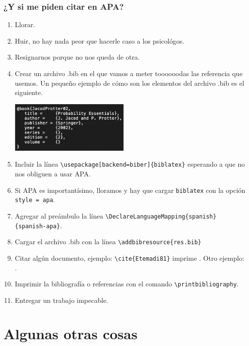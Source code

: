 \documentclass{beamer}
\begin{document}
\begin{frame}[allowframebreaks]
    \frametitle{¿Y si me piden citar en APA?}

    \begin{enumerate}
        \item Llorar.
        \item Huir, no hay nada peor que hacerle caso a los psicológos. 
        \item Resignarnos porque no nos queda de otra.
        \item Crear un archivo .bib en el que vamos a meter toooooodas las referencia que usemos. Un pequeño ejemplo de cómo son los elementos del archivo .bib es el siguiente.
        \begin{center}
            \includegraphics[height=1in]{images/ejemplo.png}
        \end{center}
        \item Incluir la línea \texttt{\textbackslash{}usepackage[backend=biber]\{biblatex\}} esperando a que no nos obliguen a usar APA.
        \item Si APA es importantísimo, lloramos y hay que cargar \texttt{biblatex} con la opción \texttt{style = apa}.
        \item Agregar al preámbulo la línea \texttt{\textbackslash{}DeclareLanguageMapping\{spanish\}\{spanish-apa\}}.
        \item Cargar el archivo .bib con la línea \texttt{\textbackslash{}addbibresource\{res.bib\}}
        \item Citar algún documento, ejemplo: \texttt{\textbackslash{}cite\{Etemadi81\}} imprime \cite{Etemadi81}. Otro ejemplo: \cite{Norris97}.
        \item Imprimir la bibliografía o referencias con el comando \texttt{\textbackslash{}printbibliography}.
        \item Entregar un trabajo impecable.
    \end{enumerate}

\end{frame}

\section{Algunas otras cosas}
\end{document}
